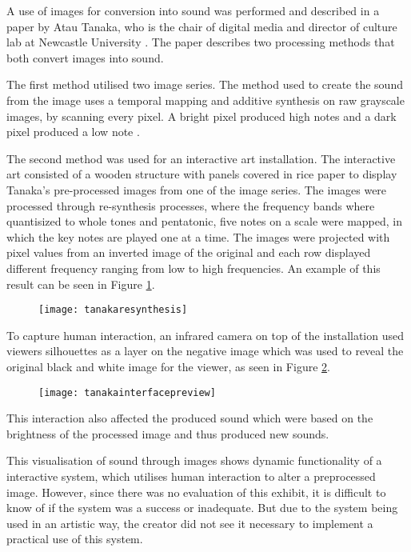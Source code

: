 A use of images for conversion into sound was performed and described in a paper by Atau Tanaka, who is the chair of digital media and director of culture lab at Newcastle University \cite{Tanaka2012}. The paper describes two processing methods that both convert images into sound.

The first method utilised two image series. The method used to create the sound from the image uses a temporal mapping and additive synthesis on raw grayscale images, by scanning every pixel. A bright pixel produced high notes and a dark pixel produced a low note \cite{Tanaka2012}.

The second method was used for an interactive art installation. The interactive art consisted of a wooden structure with panels covered in rice paper to display Tanaka's pre-processed images from one of the image series. The images were processed through re-synthesis processes, where the frequency bands where quantisized to whole tones and pentatonic, five notes on a scale were mapped, in which the key notes are played one at a time. The images were projected with pixel values from an inverted image of the original and each row displayed different frequency ranging from low to high frequencies. An example of this result can be seen in Figure \ref{fig:tanakaresynthesis}.  

\begin{figure}[!h]
\centering
\texttt{[image: tanakaresynthesis]}
\caption{\label{fig:tanakaresynthesis}\cite{Tanaka2012}}
\end{figure}

To capture human interaction, an infrared camera on top of the installation used viewers silhouettes as a layer on the negative image which was used to reveal the original black and white image for the viewer, as seen in Figure \ref{fig:tanakainterfacepreview}.

\begin{figure}[!h]
\centering
\texttt{[image: tanakainterfacepreview]}
\caption{\label{fig:tanakainterfacepreview}\cite{Tanaka2012}}
\end{figure}

This interaction also affected the produced sound which were based on the brightness of the processed image and thus produced new sounds. 

This visualisation of sound through images shows dynamic functionality of a interactive system, which utilises human interaction to alter a preprocessed image. However, since there was no evaluation of this exhibit, it is difficult to know of if the system was a success or inadequate. But due to the system being used in an artistic way, the creator did not see it necessary to implement a practical use of this system.

